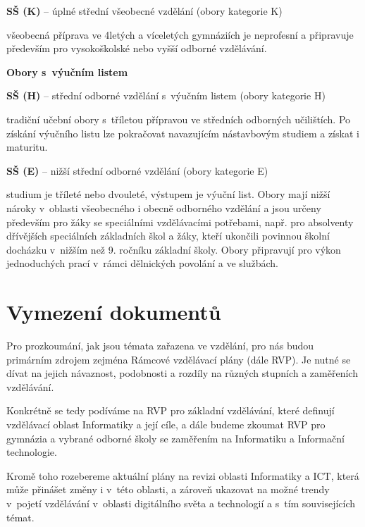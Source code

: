 \textbf{SŠ (K)} -- úplné střední všeobecné vzdělání (obory kategorie K)

\begin{displayquote}
všeobecná příprava ve 4letých a víceletých gymnáziích je neprofesní a připravuje především pro vysokoškolské nebo vyšší odborné vzdělávání.
\end{displayquote}

\textbf{Obory s~výučním listem}

\textbf{SŠ (H)} -- střední odborné vzdělání s~výučním listem (obory kategorie H)

\begin{displayquote}
tradiční učební obory s~tříletou přípravou ve středních odborných učilištích. Po získání výučního listu lze pokračovat navazujícím nástavbovým studiem a získat i maturitu.
\end{displayquote}

\textbf{SŠ (E)} -- nižší střední odborné vzdělání (obory kategorie E)

\begin{displayquote}
studium je tříleté nebo dvouleté, výstupem je výuční list. Obory mají nižší nároky v~oblasti všeobecného i obecně odborného vzdělání a jsou určeny především pro žáky se speciálními vzdělávacími potřebami, např. pro absolventy dřívějších speciálních základních škol a žáky, kteří ukončili povinnou školní docházku v~nižším než 9. ročníku základní školy. Obory připravují pro výkon jednoduchých prací v~rámci dělnických povolání a ve službách.
\end{displayquote}

\section{Vymezení dokumentů}

Pro prozkoumání, jak jsou témata zařazena ve vzdělání, pro nás budou primárním zdrojem zejména Rámcové vzdělávací plány (dále RVP). Je nutné se dívat na jejich návaznost, podobnosti a rozdíly na různých stupních a zaměřeních vzdělávání.

Konkrétně se tedy podíváme na RVP pro základní vzdělávání, které definují vzdělávací oblast Informatiky a její cíle, a dále budeme zkoumat RVP pro gymnázia a vybrané odborné školy se zaměřením na Informatiku a Informační technologie. 

Kromě toho rozebereme aktuální plány na revizi oblasti Informatiky a ICT, která může přinášet změny i v~této oblasti, a zároveň ukazovat na možné trendy v~pojetí vzdělávání v~oblasti digitálního světa a technologií a s~tím souvisejících témat.

